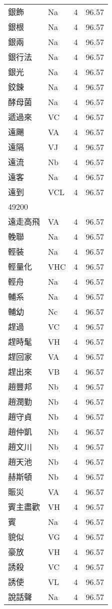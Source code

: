 \documentclass[twocolumn]{book}
\begin{document}
\begin{supertabular}{llrr}
銀飾 & Na & 4 &  96.57\\
銀根 & Na & 4 &  96.57\\
銀兩 & Na & 4 &  96.57\\
銀行法 & Na & 4 &  96.57\\
銀光 & Na & 4 &  96.57\\
鉸鍊 & Na & 4 &  96.57\\
酵母菌 & Na & 4 &  96.57\\
遞過來 & VC & 4 &  96.57\\
遠颺 & VA & 4 &  96.57\\
遠隔 & VJ & 4 &  96.57\\
遠流 & Nb & 4 &  96.57\\
遠客 & Na & 4 &  96.57\\
遠到 & VCL & 4 &  96.57\\
49200\\
遠走高飛 & VA & 4 &  96.57\\
輓聯 & Na & 4 &  96.57\\
輕裝 & Na & 4 &  96.57\\
輕量化 & VHC & 4 &  96.57\\
輕舟 & Na & 4 &  96.57\\
輔系 & Na & 4 &  96.57\\
輔幼 & Nc & 4 &  96.57\\
趕過 & VC & 4 &  96.57\\
趕時髦 & VH & 4 &  96.57\\
趕回家 & VA & 4 &  96.57\\
趕出來 & VB & 4 &  96.57\\
趙豐邦 & Nb & 4 &  96.57\\
趙潤勤 & Nb & 4 &  96.57\\
趙守貞 & Nb & 4 &  96.57\\
趙仲凱 & Nb & 4 &  96.57\\
趙文川 & Nb & 4 &  96.57\\
趙天池 & Nb & 4 &  96.57\\
赫斯頓 & Nb & 4 &  96.57\\
賑災 & VA & 4 &  96.57\\
賓主盡歡 & VH & 4 &  96.57\\
賓 & Na & 4 &  96.57\\
貌似 & VG & 4 &  96.57\\
豪放 & VH & 4 &  96.57\\
誘殺 & VC & 4 &  96.57\\
誘使 & VL & 4 &  96.57\\
說話聲 & Na & 4 &  96.57\\

\end{supertabular}
\end{document}
